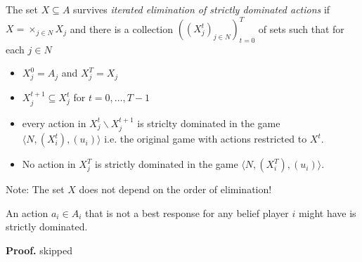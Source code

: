 \documentclass[slidestop,serif,compress]{beamer}    %
\theoremstyle{plain}
\theoremstyle{definition}
\begin{document}
{\begin{definition}
  The set $X\subseteq A$ survives \emph{iterated elimination of strictly dominated actions} if $X=\times_{j\in N}X_j$ and there is a collection $((X_j^t)_{j\in N})_{t=0}^T$ of sets such that for each $j\in N$
  \begin{itemize}
  \item $X_j^0=A_j$ and $X_j^T=X_j$
  \item $X_j^{t+1}\subseteq X_j^t$ for $t=0,\dots,T-1$
  \item every action in $X_j^t\backslash X_j^{t+1}$ is striclty dominated in the game $\langle N,(X_i^t),(u_i)\rangle$ i.e. the original game with actions restricted to $X^t$.
  \item No action in $X_j^T$ is strictly dominated in the game $\langle N,(X_i^T),(u_i)\rangle$.
  \end{itemize}
\end{definition}

Note: The set $X$ does not depend on the order of elimination!

\begin{lemma}
  An action $a_i\in A_i$ that is not a best response for any belief player $i$ might have is strictly dominated.
\end{lemma}
\textbf{Proof.} skipped

}
\end{document}
